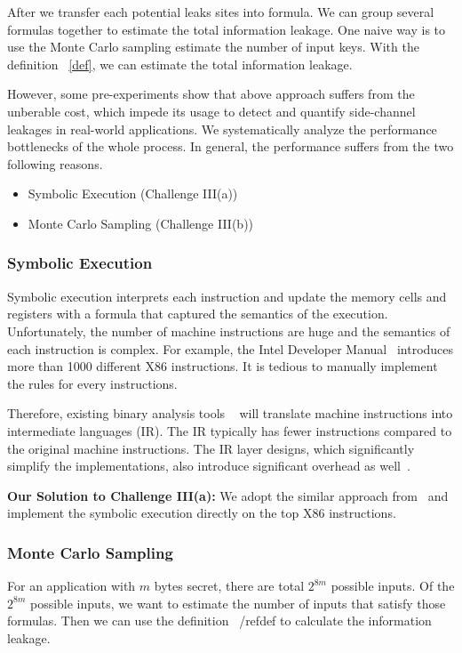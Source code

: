 After we transfer each potential leaks sites into formula. We can group several formulas together
to estimate the total information leakage. One naive way is to use the Monte Carlo sampling  estimate the
number of input keys. With the definition ~\ref{def}, we can estimate the total information leakage.

However, some pre-experiments show that above approach suffers from the unberable cost, which impede its usage
to detect and quantify side-channel leakages in real-world applications. 
We systematically analyze the performance bottlenecks of the whole process. In general, the performance suffers
from the two following reasons. 
\begin{itemize}
    \item Symbolic Execution (Challenge III(a))
    \item Monte Carlo Sampling  (Challenge III(b))
\end{itemize}

\subsubsection{Symbolic Execution}
Symbolic execution interprets each instruction and update the memory cells and registers with a 
formula that captured the semantics of the execution. Unfortunately, the number of machine instructions 
are huge and the semantics of each instruction is complex. For example, the Intel Developer Manual~\cite{intelsys}
introduces more than 1000 different X86 instructions. It is tedious to manually implement the
rules for every instructions.

Therefore, existing binary analysis tools ~\cite{shoshitaishvili2016state, 10.1007/978-3-642-22110-1_37} 
will translate machine instructions into intermediate languages (IR). The IR typically has fewer 
instructions compared to the original machine instructions. The IR layer designs, which significantly
simplify the implementations, also introduce significant overhead as well~\cite{217563}.

\vspace*{6pt}
\textbf{Our Solution to Challenge III(a):}
We adopt the similar approach from~\cite{217563} and implement the symbolic execution 
directly on the top X86 instructions.

\subsubsection{Monte Carlo Sampling}
\label{MCreasons}
For an application with $m$ bytes secret, there are total $2^{8m}$ possible inputs. Of the
$2^{8m}$ possible inputs, we want to estimate the number of inputs that satisfy those formulas.
Then we can use the definition ~/ref{def} to calculate the information leakage.

